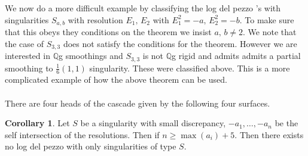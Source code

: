 \documentclass[11pt]{report}
\theoremstyle{definition}
\theoremstyle{definition}
\newtheorem{cor}[thm]{Corollary}
\theoremstyle{definition}
\theoremstyle{definition}
\theoremstyle{definition}
\theoremstyle{definition}
\theoremstyle{definition}
\theoremstyle{definition}
\newcommand{\ldp}{log del pezzo }
\newcommand{\mb}[1]{\mathbb{#1}}
\newcommand{\polygon}[5][xshift=0cm]{
  \pgfmathsetmacro{\angle}{360/#2}
  \pgfmathsetmacro{\startangle}{-90 + \angle/2}
  \pgfmathsetmacro{\y}{cos(\angle/2)}
  \begin{scope}[#1]
    \foreach \i in {1,2,...,#2} {
      \pgfmathsetmacro{\x}{\startangle + \angle*\i}
      \draw  (\x:2 cm) -- (\x + \angle:2 cm)  node [ fill=white] {5};

    }
  \end{scope}
}
\begin{document}
We now do a more difficult example by classifying the \ldp's with singularities $S_{a,b}$ with resolution $E_1, \, E_2$ with $E_1^2 = -a,\, E_2^2 = -b$. To make sure that this obeys they conditions on the theorem we insist $a, \, b \neq 2$. We note that the case of $S_{3,3}$ does not satisfy the conditions for the theorem. However we are interested in $\mb{Q}$g smoothings and $S_{3,3}$ is not $\mb{Q}$g rigid and admits admits a partial smoothing to $\frac{1}{6}(1,1)$ singularity. These were classified above. This is a more complicated example of how the above theorem can be used.
\\
\\
There are four heads of the cascade given by the following four surfaces.
\\
\begin{cor}
Let $S$ be a singularity with small discrepancy, $-a_1, \dots , -a_n$ be the self intersection of the resolutions. Then if $n \geq \max (a_i) + 5 $. Then there exists no \ldp with only singularities of type $S$.
\end{cor}
\end{document}
